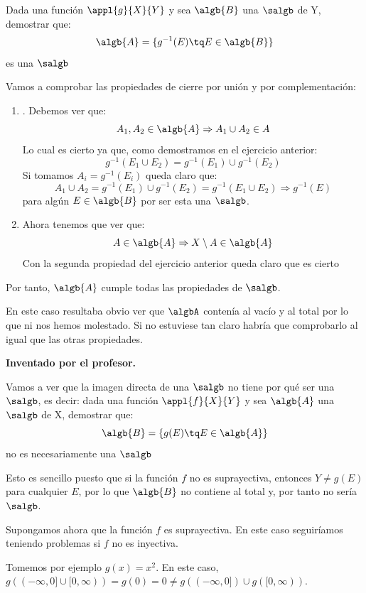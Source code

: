 \begin{problem}[5]
Dada una función $\appl{g}{X}{Y}$ y sea $\algb{B}$ una $\salgb$ de Y, demostrar que:
\[\algb{A}=\{g^{-1}(E) \tq E \in \algb{B}\}\]
es una $\salgb$

\solution
Vamos a comprobar las propiedades de cierre por unión y por complementación:
\begin{enumerate}
\item. Debemos ver que:
\[A_1, A_2\in \algb{A} \Rightarrow A_1 \cup A_2 \in A\]
Lo cual es cierto ya que, como demostramos en el ejercicio anterior:
\[g^{-1}(E_1 \cup E_2)=g^{-1}(E_1) \cup g^{-1}(E_2)\]
Si tomamos $A_i=g^{-1}(E_i)$ queda claro que:
\[A_1 \cup A_2 = g^{-1}(E_1) \cup g^{-1}(E_2) = g^{-1}(E_1\cup E_2) \Rightarrow g^{-1}(E)\]
para algún $E\in \algb{B}$ por ser esta una $\salgb$.

\item Ahora tenemos que ver que:
\[A \in \algb{A} \Rightarrow X\setminus A \in \algb{A}\]
Con la segunda propiedad del ejercicio anterior queda claro que es cierto
\end{enumerate}

Por tanto, $\algb{A}$ cumple todas las propiedades de $\salgb$.

\obs En este caso resultaba obvio ver que $\algbA$ contenía al vacío y al total por lo que ni nos hemos molestado. Si no estuviese tan claro habría que comprobarlo al igual que las otras propiedades.
\end{problem}

\begin{problem}[4-5Bis]
\textbf{Inventado por el profesor.}

Vamos a ver que la imagen directa de una $\salgb$ no tiene por qué ser una $\salgb$, es decir:
dada una función $\appl{f}{X}{Y}$ y sea $\algb{A}$ una $\salgb$ de X, demostrar que:
\[\algb{B}=\{g(E) \tq E \in \algb{A}\}\]
no es necesariamente una $\salgb$

\solution
Esto es sencillo puesto que si la función $f$ no es suprayectiva, entonces $Y \neq g(E)$ para cualquier $E$, por lo que $\algb{B}$ no contiene al total y, por tanto no sería $\salgb$.

Supongamos ahora que  la función $f$ es suprayectiva. En este caso seguiríamos teniendo problemas si $f$ no es inyectiva.

Tomemos por ejemplo $g(x)=x^2$. En este caso, $g((-\infty, 0] \cup [0, \infty))=g(0)=0 \neq g((-\infty, 0]) \cup g([0, \infty))$.
\end{problem}

